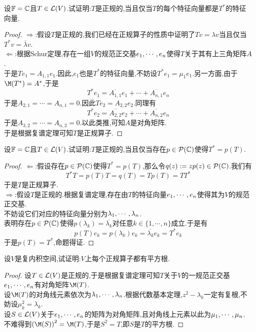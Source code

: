 \documentclass{ctexart}
\begin{document}
\begin{problem}[8.]
    设$\mathbb{F}=\mathbb{C}$且$T\in\mathcal{L}(V)$.试证明:$T$是正规的,当且仅当$T$的每个特征向量都是$T^*$的特征向量.
\end{problem}
\begin{proof}
    $\Rightarrow$:假设$T$是正规的,我们已经在正规算子的性质中证明了$Tv=\lambda v$当且仅当$T^*v=\overline{\lambda}v$.\\
    $\Leftarrow$:根据Schur定理,存在一组$V$的规范正交基${e}_1,\cdots,{e}_{n}$使得$T$关于其有上三角矩阵$A$.\\
    于是$Te_1=A_{1,1}e_1$.因此,$e_1$也是$T^*$的特征向量,不妨设$T^*e_1=\mu_1e_1$.另一方面,由于$\M(T^*)=A^*$,于是
    \[T^*e_1=\overline{A_{1,1}}e_1+\cdots+\overline{A_{n,1}}e_n\]
    于是$A_{2,1}=\cdots=A_{n,1}=0$.因此$Te_2=A_{2,2}e_2$.同理有
    \[T^*e_2=\overline{A_{2,2}}e_2+\cdots+\overline{A_{n,2}}e_n\]
    于是$A_{3,2}=\cdots=A_{n,2}=0$.以此类推,可知$A$是对角矩阵.\\
    于是根据复谱定理可知$T$是正规算子.
\end{proof}
\begin{problem}[9.]
    设$\mathbb{F}=\mathbb{C}$且$T\in\mathcal{L}(V)$.试证明:$T$是正规的,当且仅当存在$p\in\mathcal{P}(\mathbb{C})$使得$T^*=p(T)$.
\end{problem}
\begin{proof}
    $\Leftarrow$:假设存在$p\in\mathcal{P}(\mathbb{C})$使得$T^*=p(T)$,那么令$q(z):=zp(z)\in\mathcal{P}(\mathbb{C})$.我们有
    \[T^*T=p(T)T=q(T)=Tp(T)=TT^*\]
    于是$T$是正规算子.\\
    $\Rightarrow$:假设$T$是正规的.根据复谱定理,存在由$T$的特征向量${e}_1,\cdots,{e}_{n}$使得其为$V$的规范正交基.\\
    不妨设它们对应的特征向量分别为${\lambda}_1,\cdots,{\lambda}_{n}$.\\
    表明存在$p\in\mathcal{P}(\mathbb{C})$使得$p(\lambda_k)=\overline{\lambda_k}$对任意$k\in\{1,\cdots,n\}$成立.于是有
    \[p(T)e_k=p(\lambda_k)e_k=\overline{\lambda_k}e_k=T^*e_k\]
    于是$p(T)=T^*$,命题得证.
\end{proof}
\begin{problem}[10.]
    设$V$是复内积空间,试证明:$V$上每个正规算子都有平方根.
\end{problem}
\begin{proof}
    设$T\in\mathcal{L}(V)$是正规的,于是根据复谱定理可知$T$关于$V$的一规范正交基${e}_1,\cdots,{e}_{n}$有对角矩阵$\M(T)$.\\
    设$\M(T)$的对角线元素依次为${\lambda}_1,\cdots,{\lambda}_{n}$.根据代数基本定理,$z^2-\lambda_k$一定有复根,不妨设$\mu_k^2=\lambda_k$.\\
    设$S\in\mathcal{L}(V)$关于${e}_1,\cdots,{e}_{n}$的矩阵为对角矩阵,且对角线上元素以此为${\mu}_1,\cdots,{\mu}_{n}$.\\
    不难得到$\left(\M(S)\right)^2=\M(T)$,于是$S^2=T$,即$S$是$T$的平方根.
\end{proof}
\end{document}

